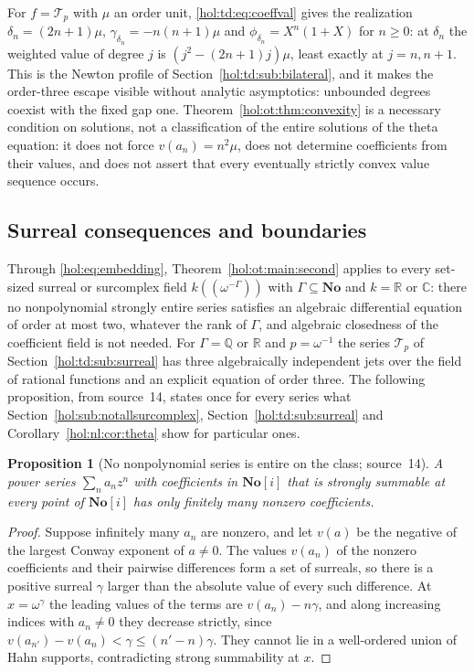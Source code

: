 \documentclass[11pt]{article}
\numberwithin{equation}{section}
\newtheorem{proposition}[theorem]{Proposition}
\theoremstyle{definition}
\theoremstyle{remark}
\newcommand{\C}{\mathbb C}
\newcommand{\R}{\mathbb R}
\newcommand{\Q}{\mathbb Q}
\newcommand{\No}{\mathbf{No}}
\begin{document}
For $f=\mathcal T_p$ with $\mu$ an order unit, \eqref{hol:td:eq:coeffval}
gives the realization $\delta_n=(2n+1)\mu$,
$\gamma_{\delta_n}=-n(n+1)\mu$ and $\phi_{\delta_n}=X^n(1+X)$ for $n\ge0$: at
$\delta_n$ the weighted value of degree $j$ is $(j^2-(2n+1)j)\mu$, least exactly
at $j=n,n+1$. This is the Newton profile of Section~\ref{hol:td:sub:bilateral},
and it makes the order-three escape visible without analytic asymptotics:
unbounded degrees coexist with the fixed gap one.
Theorem~\ref{hol:ot:thm:convexity} is a necessary condition on solutions, not
a classification of the entire solutions of the theta equation: it does not
force $v(a_n)=n^2\mu$, does not determine coefficients from their values, and
does not assert that every eventually strictly convex value sequence occurs.

\subsection{Surreal consequences and boundaries}\label{hol:ot:sub:surreal}

Through \eqref{hol:eq:embedding}, Theorem~\ref{hol:ot:main:second} applies to
every set-sized surreal or surcomplex field $k((\omega^{-\Gamma}))$ with
$\Gamma\subseteq\No$ and $k=\R$ or $\C$: there no nonpolynomial strongly
entire series satisfies an algebraic differential equation of order at most
two, whatever the rank of $\Gamma$, and algebraic closedness of the
coefficient field is not needed. For $\Gamma=\Q$ or $\R$ and $p=\omega^{-1}$
the series $\mathcal T_p$ of Section~\ref{hol:td:sub:surreal} has three
algebraically independent jets over the field of rational functions and an
explicit equation of order three. The following proposition, from source~14,
states once for every series what Section~\ref{hol:sub:notallsurcomplex},
Section~\ref{hol:td:sub:surreal} and Corollary~\ref{hol:nl:cor:theta} show for
particular ones.

\begin{proposition}[No nonpolynomial series is entire on the class;
source~14]\label{hol:ot:prop:fullclass}
A power series $\sum_na_nz^n$ with coefficients in $\No[i]$ that is strongly
summable at every point of $\No[i]$ has only finitely many nonzero
coefficients.
\end{proposition}

\begin{proof}
Suppose infinitely many $a_n$ are nonzero, and let $v(a)$ be the negative of
the largest Conway exponent of $a\ne0$. The values $v(a_n)$ of the nonzero
coefficients and their pairwise differences form a set of surreals, so there
is a positive surreal $\gamma$ larger than the absolute value of every such
difference. At $x=\omega^\gamma$ the leading values of the terms are
$v(a_n)-n\gamma$, and along increasing indices with $a_n\ne0$ they decrease
strictly, since $v(a_{n'})-v(a_n)<\gamma\le(n'-n)\gamma$. They cannot lie in a
well-ordered union of Hahn supports, contradicting strong summability at $x$.
\end{proof}
\end{document}
